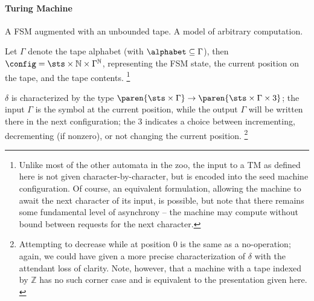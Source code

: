 \paragraph{Turing Machine}
A FSM augmented with an unbounded tape.  A model of arbitrary computation.

Let $\Gamma$ denote the tape alphabet (with $\alphabet \subseteq \Gamma$),
then $\config = \sts \times \mathbb{N} \times \Gamma^\mathbb{N}$,
representing the FSM state, the current position on the tape, and the tape
contents.%
%
\footnote{Unlike most of the other automata in the zoo, the input to a TM as
defined here is not given character-by-character, but is encoded into the
seed machine configuration.  Of course, an equivalent formulation, allowing
the machine to await the next character of its input, is possible, but note
that there remains some fundamental level of asynchrony -- the machine may
compute without bound between requests for the next character.}

$\delta$ is characterized by the type $\paren{\sts \times \Gamma} \to
\paren{\sts \times \Gamma \times 3}$; the input $\Gamma$ is the symbol at
the current position, while the output $\Gamma$ will be written there in the
next configuration; the $3$ indicates a choice between incrementing,
decrementing (if nonzero), or not changing the current position.%
%
\footnote{Attempting to decrease while at position $0$ is the same as a
no-operation; again, we could have given a more precise characterization of
$\delta$ with the attendant loss of clarity.  Note, however, that a machine
with a tape indexed by $\mathbb{Z}$ has no such corner case and is equivalent
to the presentation given here. \cite{post:1936}}

